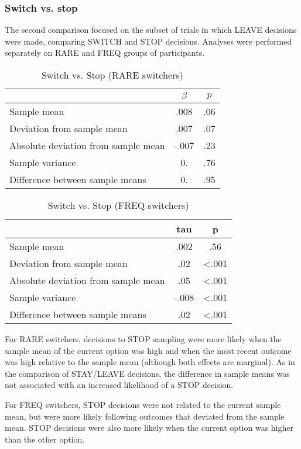 \documentclass[english,doc]{apa}
\begin{document}
\subsubsection{Switch vs. stop}

The second comparison focused on the subset of trials in which LEAVE decisions were made, comparing SWITCH and STOP decisions.
Analyses were performed separately on RARE and FREQ groups of participants.

\begin{center}
\begin{table}[htdp]
\caption{Switch vs. Stop (RARE switchers)}
\begin{tabular}{l|c|c|}
& $\beta$ & $p$ \\
\hline
Sample mean & .008 & .06 \\
Deviation from sample mean & .007 & .07 \\
Absolute deviation from sample mean & -.007 & .23 \\
Sample variance & 0. & .76 \\
Difference between sample means & 0. & .95
\end{tabular}
\label{default}
\end{table}%
\end{center}

\begin{center}
\begin{table}[htdp]
\caption{Switch vs. Stop (FREQ switchers)}
\begin{tabular}{l|c|c|}
& tau & p \\
\hline
Sample mean & .002 & .56 \\
Deviation from sample mean & .02 & <.001 \\
Absolute deviation from sample mean & .05 & <.001 \\
Sample variance & -.008 & <.001 \\
Difference between sample means & .02 & <.001
\end{tabular}
\label{default}
\end{table}%
\end{center}


For RARE switchers, decisions to STOP sampling were more likely when the sample mean of the current option was high and when the most recent outcome was high relative to the sample mean (although both effects are marginal).
As in the comparison of STAY/LEAVE decisions, the difference in sample means was not associated with an increased likelihood of a STOP decision.

For FREQ switchers, STOP decisions were not related to the current sample mean, but were more likely following outcomes that deviated from the sample mean.
STOP decisions were also more likely when the current option was higher than the other option.
\end{document}
